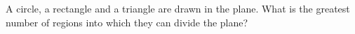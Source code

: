 A circle, a rectangle and a triangle are drawn in the plane. What is the greatest number of regions into which they can divide the plane?
